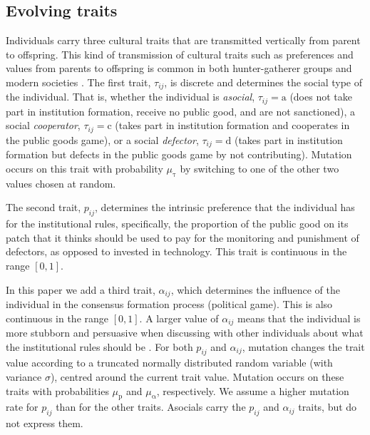 \documentclass{rstb}
\begin{document}
\begin{linenumbers}
\subsection{Evolving traits}

Individuals carry three cultural traits that are transmitted vertically from parent to offspring. This kind of transmission of cultural traits such as preferences and values from parents to offspring is common in both hunter-gatherer groups \cite{Hewlett:2011:a} and modern societies \cite{Cavalli-Sforza:1981:a}. The first trait, $\tau_{ij}$, is discrete and determines the social type of the individual. That is, whether the individual is \emph{asocial}, $\tau_{ij}=\mathrm{a}$ (does not take part in institution formation, receive no public good, and are not sanctioned), a social \emph{cooperator}, $\tau_{ij}=\mathrm{c}$ (takes part in institution formation and cooperates in the public goods game), or a social \emph{defector}, $\tau_{ij}=\mathrm{d}$ (takes part in institution formation but defects in the public goods game by not contributing). Mutation occurs on this trait with probability $\mu_\mathrm{\tau}$ by switching to one of the other two values chosen at random.

The second trait, $p_{ij}$, determines the intrinsic preference that the individual has for the institutional rules, specifically, the proportion of the public good on its patch that it thinks should be used to pay for the monitoring and punishment of defectors, as opposed to invested in technology. This trait is continuous in the range $[0,1]$. 

In this paper we add a third trait, $\alpha_{ij}$, which determines the influence of the individual in the consensus formation process (political game). This is also continuous in the range $[0,1]$. A larger value of $\alpha_{ij}$ means that the individual is more stubborn and persuasive when discussing with other individuals about what the institutional rules should be \cite{Gavrilets:2016:a,Perret:2020:a,Perret:2022:a}. For both $p_{ij}$ and $\alpha_{ij}$, mutation changes the trait value according to a truncated normally distributed random variable (with variance $\sigma$), centred around the current trait value. Mutation occurs on these traits with probabilities $\mu_\mathrm{p}$ and $\mu_\mathrm{\alpha}$, respectively. We assume a higher mutation rate for $p_{ij}$ than for the other traits. Asocials carry the $p_{ij}$ and  $\alpha_{ij}$ traits, but do not express them. 


\end{linenumbers}
\end{document}
